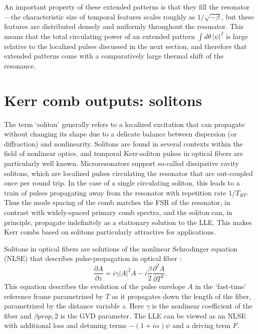 {An important property of these extended patterns is that they fill the resonator---the characteristic size of temporal features scales roughly as $1/\sqrt{-\beta}$, but these features are distributed densely and uniformly throughout the resonator. This means that the total circulating power of an extended pattern $\int d\theta\, |\psi|^2$ is large relative to the localized pulses discussed in the next section, and therefore that extended patterns come with a comparatively large thermal shift of the resonance. 



\section{Kerr comb outputs: solitons} \label{sec:LLEsolitons}

The term `soliton' generally refers to a localized excitation that can propagate without changing its shape due to a delicate balance between dispersion (or diffraction) and nonlinearity. Solitons are found in several contexts within the field of nonlinear optics, and temporal Kerr-soliton pulses in optical fibers are particularly well known. Microresonators support so-called dissipative cavity solitons, which are localized pulses circulating the resonator that are out-coupled once per round trip. In the case of a single circulating soliton, this leads to a train of pulses propagating away from the resonator with repetition rate $1/T_{RT}$. Thus the mode spacing of the comb matches the FSR of the resonator, in contrast with widely-spaced primary comb spectra, and the soliton can, in principle, propagate indefinitely as a stationary solution to the LLE. This makes Kerr combs based on solitons particularly attractive for applications.

Solitons in optical fibers are solutions of the nonlinear Schrodinger equation (NLSE) that describes pulse-propagation in optical fiber \cite{Agrawal2007}:
\begin{equation}
\frac{\partial A}{\partial z}= i\gamma|A|^2 A -i \frac{\beta}{2} \frac{\partial^2 A}{\partial T^2}. \label{NLSE}
\end{equation}
This equation describes the evolution of the pulse envelope $A$ in the `fast-time' reference frame parametrized by $T$ as it propagates down the length of the fiber, parametrized by the distance variable $z$. Here $\gamma$ is the nonlinear coefficient of the fiber and $\beta{prop,2}$ is the GVD parameter. The LLE can be viewed as an NLSE with additional loss and detuning terms $-(1+i\alpha)\psi$ and a driving term $F$.

}
